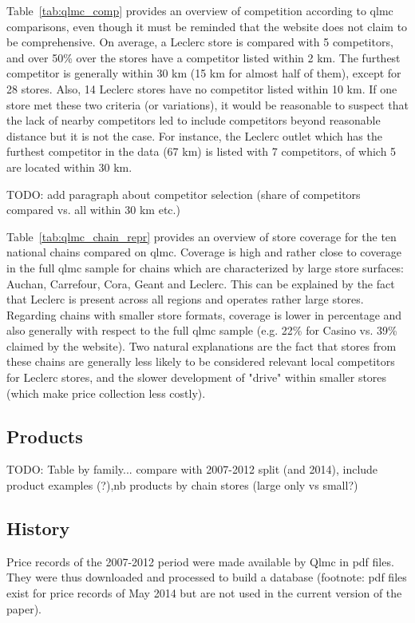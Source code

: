 \documentclass[english]{article}
\begin{document}
Table~\ref{tab:qlmc_comp} provides an overview of competition according to qlmc comparisons, even though it must be reminded that the website does not claim to be comprehensive. On average, a Leclerc store is compared with 5 competitors, and over 50\% over the stores have a competitor listed within 2 km. The furthest competitor is generally within 30 km (15 km for almost half of them), except for 28 stores. Also, 14 Leclerc stores have no competitor listed within 10 km. If one store met these two criteria (or variations), it would be reasonable to suspect that the lack of nearby competitors led to include competitors beyond reasonable distance but it is not the case. For instance, the Leclerc outlet which has the furthest competitor in the data (67 km) is listed with 7 competitors, of which 5 are located within 30 km.

TODO: add paragraph about competitor selection (share of competitors compared vs. all within 30 km etc.)

Table~\ref{tab:qlmc_chain_repr} provides an overview of store coverage for the ten national chains compared on qlmc. Coverage is high and rather close to coverage in the full qlmc sample for chains which are characterized by large store surfaces: Auchan, Carrefour, Cora, Geant and Leclerc. This can be explained by the fact that Leclerc is present across all regions and operates rather large stores. Regarding chains with smaller store formats, coverage is lower in percentage and also generally with respect to the full qlmc sample (e.g. 22\% for Casino vs. 39\% claimed by the website). Two natural explanations are the fact that stores from these chains are generally less likely to be considered relevant local competitors for Leclerc stores, and the slower development of "drive" within smaller stores (which make price collection less costly).

\subsection{Products}

TODO: Table by family... compare with 2007-2012 split (and 2014), include product examples (?),nb products by chain stores (large only vs small?)

\subsection{History}

Price records of the 2007-2012 period were made available by Qlmc in pdf files. They were thus downloaded and processed to build a database (footnote: pdf files exist for price records of May 2014 but are not used in the current version of the paper).
\end{document}
